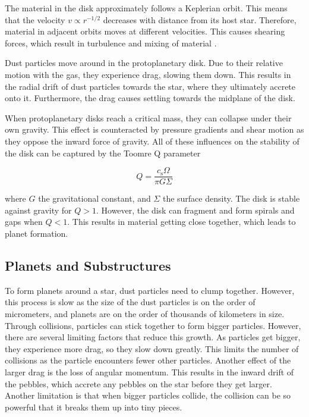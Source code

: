 \documentclass[oneside, single, authoryear, semicolon, 12pt]{lion-msc}
\newcommand{\4}{$_4$}
\newcommand{\3}{$_3$}
\newcommand{\2}{$_2$}
\begin{document}
The material in the disk approximately follows a Keplerian orbit. This means that the velocity $v \propto r^{-1/2}$ decreases with distance from its host star. Therefore, material in adjacent orbits moves at different velocities. This causes shearing forces, which result in turbulence and mixing of material \citep{chap1}.  

Dust particles move around in the protoplanetary disk. Due to their relative motion with the gas, they experience drag, slowing them down. This results in the radial drift of dust particles towards the star, where they ultimately accrete onto it. Furthermore, the drag causes settling towards the midplane of the disk. 

When protoplanetary disks reach a critical mass, they can collapse under their own gravity. This effect is counteracted by pressure gradients and shear motion as they oppose the inward force of gravity. All of these influences on the stability of the disk can be captured by the Toomre Q parameter \citep{1964ApJ...139.1217T}

\begin{equation}
    Q = \frac{c_\mathrm{s}\Omega}{\pi G\Sigma}
\end{equation}

where $G$ the gravitational constant, and $\Sigma$ the surface density. The disk is stable against gravity for $Q > 1$. However, the disk can fragment and form spirals and gaps when $Q < 1$. This results in material getting close together, which leads to planet formation.

\subsection{Planets and Substructures}

To form planets around a star, dust particles need to clump together. However, this process is slow as the size of the dust particles is on the order of micrometers, and planets are on the order of thousands of kilometers in size. Through collisions, particles can stick together to form bigger particles. However, there are several limiting factors that reduce this growth. As particles get bigger, they experience more drag, so they slow down greatly. This limits the number of collisions as the particle encounters fewer other particles. Another effect of the larger drag is the loss of angular momentum. This results in the inward drift of the pebbles, which accrete any pebbles on the star before they get larger. Another limitation is that when bigger particles collide, the collision can be so powerful that it breaks them up into tiny pieces. 
\end{document}
